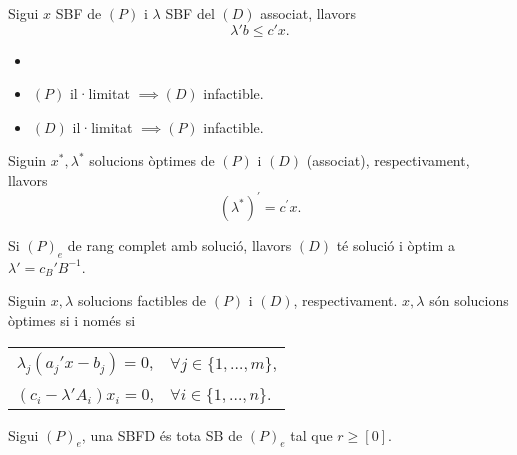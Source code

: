 \begin{teo}
    Sigui $x$ SBF de $(P)$ i $\lambda$ SBF del $(D)$ associat, llavors
    \[ \lambda' b\leq c'x. \]
\end{teo}
\begin{col}
    \begin{itemize}
        \item[]
        \item $(P)$ il·limitat $\implies (D)$ infactible.
        \item $(D)$ il·limitat $\implies (P)$ infactible.
    \end{itemize}
\end{col}
\begin{teo}
    Siguin $x^*, \lambda^*$ solucions òptimes de $(P)$ i $(D)$ (associat), respectivament, llavors
    \[ (\lambda^*)^\prime = c^\prime x.\]
\end{teo}
\begin{col}
    Si $(P)_e$ de rang complet amb solució, llavors $(D)$ té solució i òptim a $\lambda' = c_B'B^{-1}$.
\end{col}
\begin{teo}
    Siguin $x, \lambda$ solucions factibles de $(P)$ i $(D)$, respectivament. $x, \lambda$ són solucions òptimes si i només si
    \begin{center}
        \begin{tabular}{cl}
            $\lambda_j (a_j'x - b_j) = 0$, & $\forall j \in \{1, \dots, m\}$, \\
            $(c_i - \lambda'A_i) x_i = 0$, & $\forall i \in \{1, \dots, n\}$.
        \end{tabular}
    \end{center}
\end{teo}
\begin{defi}
    Sigui $(P)_e$, una SBFD és tota SB de $(P)_e$ tal que $r \geq [0]$.
\end{defi}
